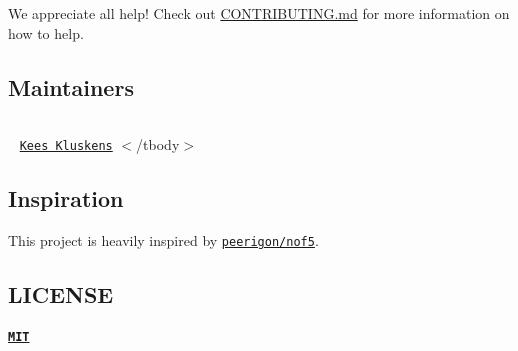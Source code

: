 We appreciate all help! Check out \mbox{\hyperlink{readable-stream_2_c_o_n_t_r_i_b_u_t_i_n_g_8md}{C\+O\+N\+T\+R\+I\+B\+U\+T\+I\+NG.md}} for more information on how to help.

\subsection*{Maintainers}

\tabulinesep=1mm
\begin{longtabu} spread 0pt [c]{*{0}{|X[-1]}|}
\hline
\end{longtabu}


 ~\newline
 \href{https://github.com/}{\tt Kees Kluskens}   $<$/tbody$>$ 

\subsection*{Inspiration}

This project is heavily inspired by \href{https://github.com/peerigon/nof5}{\tt peerigon/nof5}.

\subsection*{L\+I\+C\+E\+N\+SE}

\paragraph*{\href{./LICENSE}{\tt M\+IT}}